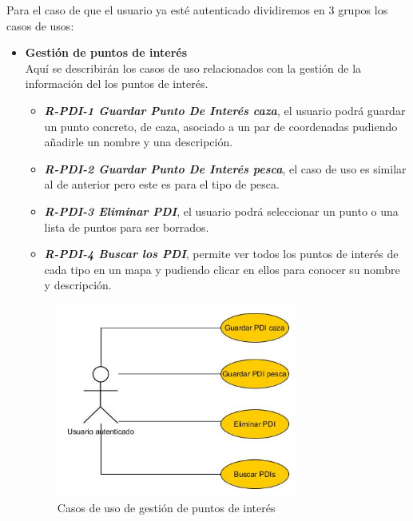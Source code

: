 Para el caso de que el usuario ya esté autenticado dividiremos en 3 grupos los casos de usos:
\begin{itemize}
\item \textbf{Gestión de puntos de interés}\\
Aquí se describirán los casos de uso relacionados con la gestión  de la información del los puntos de interés.
\begin{itemize}
\item\textbf{\textit{ R-PDI-1 Guardar Punto De Interés caza}}, el usuario podrá guardar un punto concreto, de caza, asociado a un par de coordenadas pudiendo añadirle un nombre y una descripción.
\item\textit{ \textbf{R-PDI-2 Guardar Punto De Interés pesca}}, el caso de uso es similar al de anterior pero este es para el tipo de pesca.
\item \textbf{\textit{R-PDI-3 Eliminar PDI}}, el usuario podrá seleccionar un punto o una lista de puntos para ser borrados.
\item \textbf{\textit{R-PDI-4 Buscar los PDI}}, permite ver todos los puntos de interés de cada tipo en un mapa y pudiendo clicar en ellos para conocer su nombre y descripción.
\end{itemize} 

\begin{figure}[H]
		\centering
		\includegraphics[width=0.75\textwidth] {PDI.jpg}
		\caption{Casos de uso de gestión de puntos de interés }\label{fig:PDI}
	\end{figure}
	
	
	

\end{itemize}
